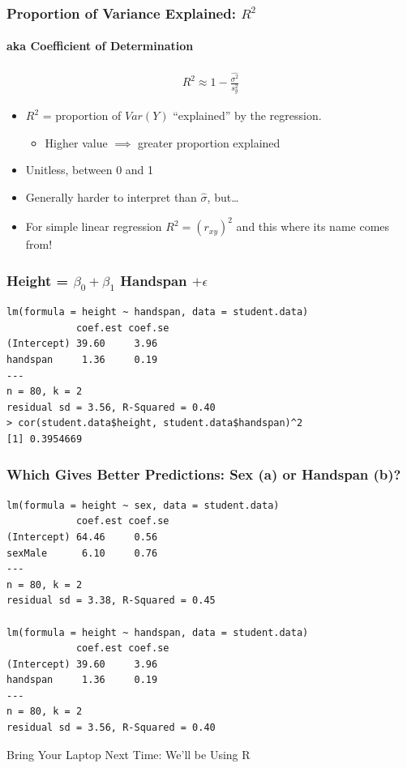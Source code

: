 \documentclass[handout]{beamer}
\begin{document}
\begin{frame}
\frametitle{Proportion of Variance Explained: $R^2$}
\framesubtitle{aka Coefficient of Determination}
	\begin{eqnarray*}
		R^2 \approx 1 - \frac{\widehat{\sigma^2}}{s_y^2}
	\end{eqnarray*}
		\begin{itemize}
			\item $R^2$ = proportion of $Var(Y)$ 
        ``explained'' by the regression.
			\begin{itemize}
			\item Higher value $\implies$ greater proportion explained 
			\end{itemize}
			\item Unitless, between 0 and 1 
      \item Generally harder to interpret than $\widehat{\sigma}$, but\dots 
			\item \alert{For simple linear regression $R^2 = (r_{xy})^2$ and this where its name comes from!}
		\end{itemize}
\end{frame}



\begin{frame}[fragile]
\frametitle{Height = $\beta_0 + \beta_1$ Handspan $+ \epsilon$}
\footnotesize
\begin{verbatim}
lm(formula = height ~ handspan, data = student.data)
            coef.est coef.se
(Intercept) 39.60     3.96  
handspan     1.36     0.19  
---
n = 80, k = 2
residual sd = 3.56, R-Squared = 0.40
> cor(student.data$height, student.data$handspan)^2
[1] 0.3954669
\end{verbatim}
\end{frame}


\begin{frame}[fragile]
\frametitle{Which Gives Better Predictions: Sex (a) or Handspan (b)?}
\footnotesize
\begin{verbatim}
lm(formula = height ~ sex, data = student.data)
            coef.est coef.se
(Intercept) 64.46     0.56  
sexMale      6.10     0.76  
---
n = 80, k = 2
residual sd = 3.38, R-Squared = 0.45

lm(formula = height ~ handspan, data = student.data)
            coef.est coef.se
(Intercept) 39.60     3.96  
handspan     1.36     0.19  
---
n = 80, k = 2
residual sd = 3.56, R-Squared = 0.40
\end{verbatim}

\end{frame}


\begin{frame}
\begin{center}
\Huge Bring Your Laptop Next Time: We'll be Using R
\end{center}

\end{frame}


\end{document}
